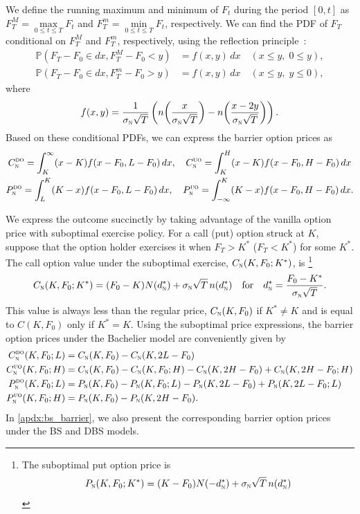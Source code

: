\documentclass[a4paper,review]{elsarticle}
\newcommand{\qtext}[2][\quad]{#1\text{#2}#1}
\newcommand{\sigman}{\sigma_\textsc{n}}
\newcommand{\norm}{\textsc{n}}
\newcommand{\Call}[2]{C_\textsc{#1}^\textsc{#2}}
\newcommand{\Put}[2]{P_\textsc{#1}^\textsc{#2}}
\begin{document}
We define the running maximum and minimum of $F_t$ during the period $[0,t]$ as $F_T^M=\max \limits_{0\le t \le T}F_t$ and $F_T^m=\min \limits_{0\le t \le T}F_t$, respectively. We can find the PDF of $F_T$ conditional on $F_T^M$ and $F_T^m$, respectively, using the reflection principle~\citep[\S~1.8]{harrison1985brownian}:
\begin{align*}
\mathbb{P}(F_T-F_0\in dx, F^M_T-F_0 < y) &= f(x,y)\, dx \quad (x\leq y,\; 0 \leq y),\\
\mathbb{P}(F_T-F_0\in dx, F^m_T-F_0 > y) &= f(x,y)\, dx \quad (x\leq y,\; y \leq 0),
\end{align*}
where
$$ f(x,y) = \frac{1}{\sigman\sqrt{T}}\left( n\!\left(\frac{x}{\sigman\sqrt{T}}\right)- n\!\left(\frac{x-2y}{\sigman\sqrt{T}}\right) \right).
$$
Based on these conditional PDFs, we can express the barrier option prices as 
\begin{gather*}
\Call{n}{do} = \int_K^{\infty} (x-K) f(x-F_0,L-F_0)\, dx, \quad \Call{n}{uo} = \int_{K}^{H} (x-K) f(x-F_0,H-F_0)\, dx \\
\Put{n}{do} = \int_{L}^{K} (K-x) f(x-F_0,L-F_0)\, dx, \quad \Put{n}{uo} = \int_{-\infty}^{K}(K-x) f(x-F_0,H-F_0)\, dx.
\end{gather*}

We express the outcome succinctly by taking advantage of the vanilla option price with suboptimal exercise policy. For a call (put) option struck at $K$, suppose that the option holder exercises it when $F_T>K^*$ ($F_T<K^*$) for some $K^*$. The call option value under the suboptimal exercise, $C_\norm(K, F_0; K^*)$, is \footnote{
The suboptimal put option price is
$$P_\norm(K, F_0; K^*) = (K - F_0) N(-d^*_\norm) + \sigman\sqrt{T} \, n(d^*_\norm)$$}
\begin{equation} \label{eq:bach_h}
C_\norm(K, F_0; K^*) = (F_0 - K) N(d^*_\norm) + \sigman\sqrt{T} \, n(d^*_\norm)
\qtext{for} d^*_\norm = \frac{F_0 - K^*}{\sigman \sqrt{T}}.
\end{equation}
This value is always less than the regular price, $C_\norm(K, F_0)$ if $K^*\neq K$ and is equal to $C(K, F_0)$ only if $K^*= K$. Using the suboptimal price expressions, the barrier option prices under the Bachelier model are conveniently given by
\begin{align}
\Call{n}{do}(K, F_0; L) &= C_\norm(K, F_0)- C_\norm(K, 2L-F_0) \label{eq:DO_call}\\
\Call{n}{uo}(K, F_0; H) &= C_\norm(K, F_0) - C_\norm(K, F_0; H) - C_\norm(K, 2H-F_0) + C_\norm(K, 2H-F_0; H) \label{eq:UO_call} \\
\Put{n}{do}(K, F_0; L) &= P_\norm(K, F_0)-P_\norm(K, F_0; L) - P_\norm(K, 2L-F_0) + P_\norm(K, 2L-F_0; L) \label{eq:DO_put} \\
\Put{n}{uo}(K, F_0; H) &= P_\norm(K, F_0) - P_\norm(K, 2H-F_0). \label{eq:UO_put}
\end{align}
In \ref{apdx:bs_barrier}, we also present the corresponding barrier option prices under the BS and DBS models. 
\end{document}
